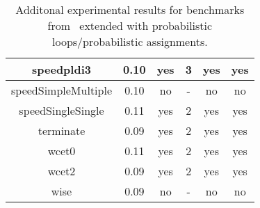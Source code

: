 \begin{center}
\begin{table}[]
\begin{tabular}{c|c|c|c|c|c}
{speedpldi3} & {0.10} & {yes} & {3} & {yes} & {yes} \\\hline
{speedSimpleMultiple} & {0.10} & {no} & {-} & {no} & {no} \\\hline
{speedSingleSingle} & {0.11} & {yes} & {2} & {yes} & {yes} \\\hline
{terminate} & {0.09} & {yes} & {2} & {yes} & {yes} \\\hline
{wcet0} & {0.11} & {yes} & {2} & {yes} & {yes} \\\hline
{wcet2} & {0.09} & {yes} & {2} & {yes} & {yes} \\\hline
{wise} & {0.09} & {no} & {-} & {no} & {no} \\\hline
    \end{tabular}
    \caption{Additonal experimental results for benchmarks from~\cite{ADFG10:lexicographic} extended with probabilistic loops/probabilistic assignments.}
    \label{tab:exp3}
\end{table}
\end{center}


